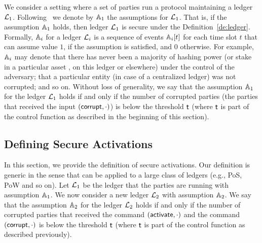 We consider a setting where a set of parties run a protocol maintaining a ledger $\mathcal{L}_1$. Following~\cite{sidechain} we denote by $\mathbb{A}_1$
the assumptions for $\mathcal{L}_1$.
 That is, if the assumption $\mathbb{A}_1$ holds, then ledger $\mathcal{L}_1$ is secure under the Definition~\ref{de:ledger}.
Formally, $\mathbb{A}_i$ for a ledger $\mathcal{L}_i$ is a sequence of events $\mathbb{A}_i[t]$ for each time slot $t$ that can assume value $1$, 
if the assumption is satisfied, and $0$ otherwise.
For example, $\mathbb{A}_i$ may denote that
there has never been a majority of hashing power (or stake in a particular
asset
, on this ledger or elsewhere) under the control of the adversary; that a
particular entity (in case of a centralized ledger) was not corrupted; and so
on.
Without loss of generality, we say that the assumption $\mathbb{A}_1$ for the ledger $\mathcal{L}_1$ holds if and only if the number of corrupted parties (the parties
that received the input $(\mathsf{corrupt}, \cdot)$) is below the threshold $\mathsf{t}$ (where $\mathsf{t}$ is part of the control function as described in the beginning 
of this section).







\subsection{Defining Secure Activations}
In this section, we provide the definition of secure activations. Our definition is generic in the sense that can be applied to a large class of ledgers 
(e.g., PoS, PoW and so on).
Let $\mathcal{L}_1$ be the ledger that the parties are running with assumption $\mathbb{A}_1$. We now consider a new ledger $\mathcal{L}_2$ with assumption $\mathbb{A}_2$.
We say that the assumption $\mathbb{A}_2$ for the ledger $\mathcal{L}_2$ holds if and only if the number of corrupted parties 
that received the command $(\mathsf{activate}, \cdot)$ and the command $(\mathsf{corrupt},\cdot)$
 is below the threshold $\mathsf{t}$ (where $\mathsf{t}$ is part of the control function as described previously).


